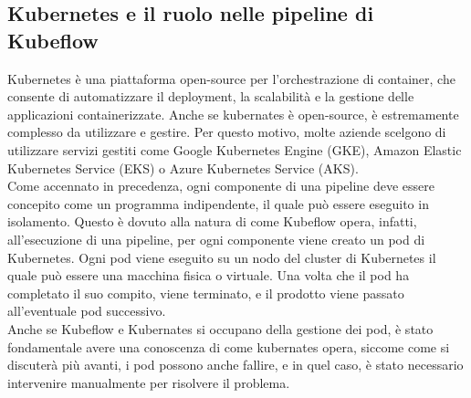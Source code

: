 \subsection{Kubernetes e il ruolo nelle pipeline di Kubeflow}
Kubernetes è una piattaforma open-source per l'orchestrazione di container, che consente
di automatizzare il deployment, la scalabilità e la gestione delle applicazioni containerizzate.
Anche se kubernates è open-source, è estremamente complesso da utilizzare e gestire.
Per questo motivo, molte aziende scelgono di utilizzare servizi gestiti come Google Kubernetes Engine (GKE),
Amazon Elastic Kubernetes Service (EKS) o Azure Kubernetes Service (AKS).\\


Come accennato in precedenza, ogni componente di una pipeline
deve essere concepito come un programma indipendente, il quale
può essere eseguito in isolamento.
Questo è dovuto alla natura di come Kubeflow opera, infatti,
all'esecuzione di una pipeline, per ogni componente viene creato
un pod di Kubernetes. Ogni pod viene eseguito su un nodo del cluster di Kubernetes
il quale può essere una macchina fisica o virtuale.
Una volta che il pod ha completato il suo compito, viene terminato, e
il prodotto viene passato all'eventuale pod successivo.\\


Anche se Kubeflow e Kubernates si occupano della gestione dei pod,
è stato fondamentale avere una conoscenza di come kubernates opera, siccome
come si discuterà più avanti, i pod possono anche fallire,
e in quel caso, è stato necessario intervenire manualmente
per risolvere il problema.












